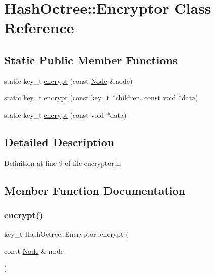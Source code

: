 \hypertarget{class_hash_octree_1_1_encryptor}{}\section{Hash\+Octree\+::Encryptor Class Reference}
\label{class_hash_octree_1_1_encryptor}
\subsection*{Static Public Member Functions}
\begin{DoxyCompactItemize}
\item 
static key\+\_\+t \mbox{\hyperlink{class_hash_octree_1_1_encryptor_a02e1c9d854ee1d296cee98776e098fe5}{encrypt}} (const \mbox{\hyperlink{class_hash_octree_1_1_node}{Node}} \&node)
\item 
static key\+\_\+t \mbox{\hyperlink{class_hash_octree_1_1_encryptor_a513e44d8beda3d37460fefdca165a9e3}{encrypt}} (const key\+\_\+t $\ast$children, const void $\ast$data)
\item 
static key\+\_\+t \mbox{\hyperlink{class_hash_octree_1_1_encryptor_a96ce6d479c6b28f1f61c99989aa7a976}{encrypt}} (const void $\ast$data)
\end{DoxyCompactItemize}


\subsection{Detailed Description}


Definition at line 9 of file encryptor.\+h.



\subsection{Member Function Documentation}
\mbox{\label{class_hash_octree_1_1_encryptor_a02e1c9d854ee1d296cee98776e098fe5}} 
\subsubsection{\texorpdfstring{encrypt()}{encrypt()}\hspace{0.1cm}{\footnotesize\ttfamily [1/3]}}
{\footnotesize\ttfamily key\+\_\+t Hash\+Octree\+::\+Encryptor\+::encrypt (\begin{DoxyParamCaption}\item[{const \mbox{\hyperlink{class_hash_octree_1_1_node}{Node}} \&}]{node }\end{DoxyParamCaption})\hspace{0.3cm}{\ttfamily [static]}}

